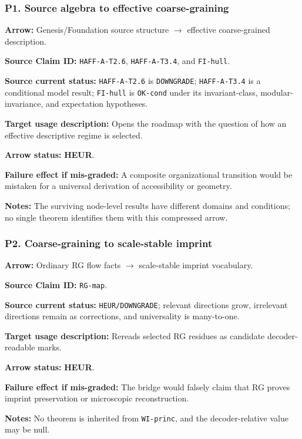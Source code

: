 \documentclass[12pt,a4paper]{article}
\begin{document}
\subsubsection*{P1. Source algebra to effective coarse-graining}
\noindent\textbf{Arrow:} Genesis/Foundation source structure
\(\to\) effective coarse-grained description.\par
\noindent\textbf{Source Claim ID:} \texttt{HAFF-A-T2.6},
\texttt{HAFF-A-T3.4}, and \texttt{FI-hull}.\par
\noindent\textbf{Source current status:} \texttt{HAFF-A-T2.6} is
\texttt{DOWNGRADE}; \texttt{HAFF-A-T3.4} is a conditional model result;
\texttt{FI-hull} is \texttt{OK-cond} under its invariant-class,
modular-invariance, and expectation hypotheses.\par
\noindent\textbf{Target usage description:} Opens the roadmap with the
question of how an effective descriptive regime is selected.\par
\noindent\textbf{Arrow status:} \textbf{HEUR}.\par
\noindent\textbf{Failure effect if mis-graded:} A composite organizational
transition would be mistaken for a universal derivation of accessibility
or geometry.\par
\noindent\textbf{Notes:} The surviving node-level results have different
domains and conditions; no single theorem identifies them with this
compressed arrow.\par

\subsubsection*{P2. Coarse-graining to scale-stable imprint}
\noindent\textbf{Arrow:} Ordinary RG flow facts \(\to\) scale-stable
imprint vocabulary.\par
\noindent\textbf{Source Claim ID:} \texttt{RG-map}.\par
\noindent\textbf{Source current status:} \texttt{HEUR/DOWNGRADE};
relevant directions grow, irrelevant directions remain as corrections,
and universality is many-to-one.\par
\noindent\textbf{Target usage description:} Rereads selected RG residues
as candidate decoder-readable marks.\par
\noindent\textbf{Arrow status:} \textbf{HEUR}.\par
\noindent\textbf{Failure effect if mis-graded:} The bridge would falsely
claim that RG proves imprint preservation or microscopic reconstruction.\par
\noindent\textbf{Notes:} No theorem is inherited from \texttt{WI-princ},
and the decoder-relative value may be null.\par
\end{document}
